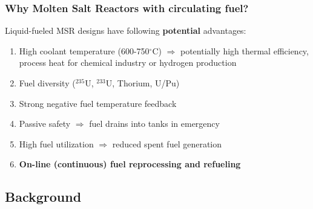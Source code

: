 \begin{frame}
\frametitle{Why Molten Salt Reactors with circulating fuel?}
\begin{block}{Liquid-fueled \gls{MSR} designs have following \textbf{potential} advantages:}
	\begin{enumerate}
		\itemsep1em
		\item High coolant temperature (600-750$^{\circ}$C) 
		$\Rightarrow$ potentially high thermal efficiency, process 
		heat for chemical industry or hydrogen production
		\item Fuel diversity ($^{235}$U, $^{233}$U, Thorium, U/Pu)
		\item Strong negative fuel temperature feedback 
		\item Passive safety $\Rightarrow$ fuel drains into tanks 
		in emergency
		\item High fuel utilization $\Rightarrow$ reduced spent fuel 
		generation
		\item<2> \textbf{On-line (continuous) fuel reprocessing and refueling}
	\end{enumerate}
\end{block}

\end{frame}


\subsection{Background}

